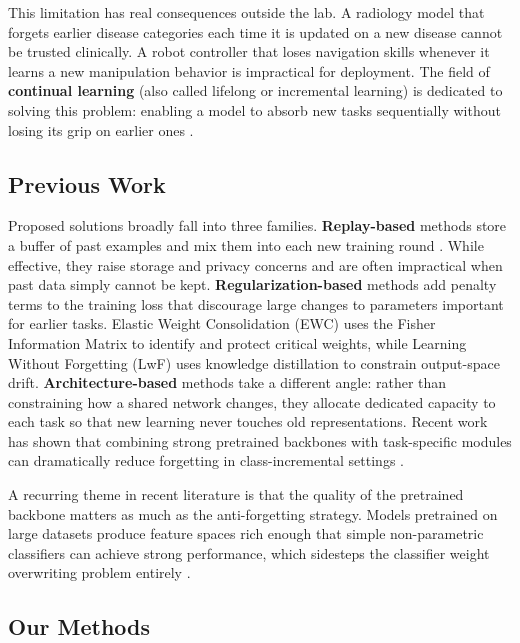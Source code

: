 \documentclass{article}
\begin{document}
This limitation has real consequences outside the lab. A radiology model that
forgets earlier disease categories each time it is updated on a new disease
cannot be trusted clinically. A robot controller that loses navigation skills
whenever it learns a new manipulation behavior is impractical for deployment.
The field of \textbf{continual learning} (also called lifelong or incremental
learning) is dedicated to solving this problem: enabling a model to absorb new
tasks sequentially without losing its grip on earlier ones \citep{li2017learning}.

\subsection{Previous Work}

Proposed solutions broadly fall into three families. \textbf{Replay-based}
methods store a buffer of past examples and mix them into each new training
round \citep{zhu2021prototype}. While effective, they raise storage and privacy
concerns and are often impractical when past data simply cannot be kept.
\textbf{Regularization-based} methods add penalty terms to the training loss
that discourage large changes to parameters important for earlier tasks. Elastic
Weight Consolidation (EWC) \citep{kirkpatrick2017overcoming} uses the Fisher
Information Matrix to identify and protect critical weights, while Learning
Without Forgetting (LwF) \citep{li2017learning} uses knowledge distillation to
constrain output-space drift. \textbf{Architecture-based} methods take a
different angle: rather than constraining how a shared network changes, they
allocate dedicated capacity to each task so that new learning never touches old
representations. Recent work has shown that combining strong pretrained
backbones with task-specific modules can dramatically reduce forgetting in
class-incremental settings \citep{zhou2024revisiting, zhang2023slca,
zhu2021prototype}.

A recurring theme in recent literature is that the quality of the pretrained
backbone matters as much as the anti-forgetting strategy. Models pretrained on
large datasets produce feature spaces rich enough that simple non-parametric
classifiers can achieve strong performance, which sidesteps the classifier
weight overwriting problem entirely \citep{zhou2024revisiting}.

\subsection{Our Methods}
\end{document}
